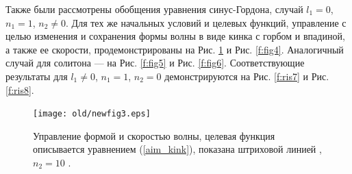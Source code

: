 Также были рассмотрены обобщения уравнения синус-Гордона, случай $l_1 = 0$, $n_1 = 1$, $n_2 \ne 0$. Для тех же начальных условий и целевых функций, управление с целью изменения и сохранения формы волны в виде кинка с горбом и впадиной, а также ее скорости, продемонстрированы на Рис. \ref{f:fig3} и Рис. \ref{f:fig4}. Аналогичный случай для солитона --- на Рис. \ref{f:fig5} и Рис. \ref{f:fig6}. Соответствующие результаты для $l_1 \ne 0$, $n_1 = 1$, $n_2 = 0$ демонстрируются на Рис. \ref{f:ris7} и Рис. \ref{f:ris8}.
%

\begin{figure}[!ht]
	\begin{center}
		\texttt{[image: old/newfig3.eps]}
	\end{center}
	\caption{\label{f:fig3}Управление формой и скоростью волны, целевая функция описывается уравнением (\ref{aim_kink}), показана штриховой линией \cite{porant16}, $n_2 = 10$ \cite{porant16}.}
\end{figure}

